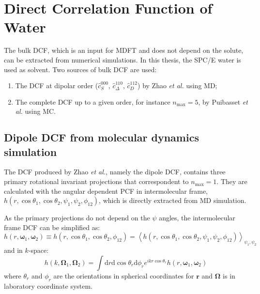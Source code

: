 
\chapter{Direct Correlation Function of Water\label{chpt:dcf-water}}

The bulk \acs{DCF}, which is an input for \acs{MDFT} and does not
depend on the solute, can be extracted from numerical simulations.
In this thesis, the SPC/E water is used as solvent. Two sources of
bulk \acs{DCF} are used: 
\begin{enumerate}
\item The \acs{DCF} at dipolar order ($\hat{c}_{S}^{000}$, $\hat{c}_{\Delta}^{110}$,
$\hat{c}_{D}^{112}$) by Zhao \textit{et al.} \citep{zhao_accurate_2013}
using \acs{MD};
\item The complete \acs{DCF} up to a given order, for instance $n_{\max}=5$,
by Puibasset \textit{et al.} \citep{puibasset_bridge_2012} using
\acs{MC}.
\end{enumerate}

\section{Dipole DCF from molecular dynamics simulation}

The \acs{DCF} produced by Zhao \textit{et al.}, namely the dipole
\acs{DCF}, contains three primary rotational invariant projections
that correspondent to $n_{\max}=1$. They are calculated with the
angular dependent \acs{PCF} in intermolecular frame, $h(r,\cos\theta_{1},\cos\theta_{2},\psi_{1},\psi_{2},\phi_{12})$,
which is directly extracted from \acs{MD} simulation. 

As the primary projections do not depend on the $\psi$ angles, the
intermolecular frame \acs{DCF} can be simplified as:
\begin{equation}
h(r,\boldsymbol{\omega}_{1},\boldsymbol{\omega}_{2})\equiv h(r,\cos\theta_{1},\cos\theta_{2},\phi_{12})=\left\langle h(r,\cos\theta_{1},\cos\theta_{2},\psi_{1},\psi_{2},\phi_{12})\right\rangle _{\psi_{1},\psi_{2}}\label{eq:h-linear}
\end{equation}
and in $k$-space:
\begin{equation}
h(k,\mathbf{\Omega}_{1},\mathbf{\Omega}_{2})=\int\mathrm{d}r\mathrm{d}\cos\theta_{r}\mathrm{d}\phi_{r}e^{ikr\cos\theta_{r}}h(r,\boldsymbol{\omega}_{1},\boldsymbol{\omega}_{2})
\end{equation}
where $\theta_{r}$ and $\phi_{r}$ are the orientations in spherical
coordinates for $\mathbf{r}$ and $\mathbf{\Omega}$ is in laboratory
coordinate system.

